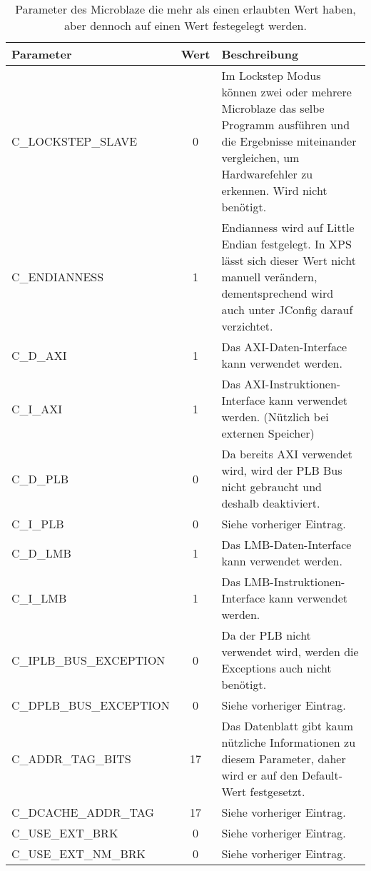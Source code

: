 \begin{table}[ht!]
\begin{tabular}{|l|c|p{10cm}|}
\hline \textbf{Parameter} & Wert & Beschreibung \\ 
\hline C\_LOCKSTEP\_SLAVE & 0 & Im Lockstep Modus können zwei oder mehrere \newline Microblaze das selbe Programm ausführen und die Ergebnisse miteinander vergleichen, um Hardwarefehler zu erkennen. Wird nicht benötigt.\\ 
\hline C\_ENDIANNESS & 1 & Endianness wird auf Little Endian festgelegt. In XPS lässt sich dieser Wert nicht manuell verändern, dementsprechend wird auch unter JConfig darauf verzichtet.\\ 
\hline C\_D\_AXI & 1 & Das AXI-Daten-Interface kann verwendet werden. \\ 
\hline C\_I\_AXI & 1 & Das AXI-Instruktionen-Interface kann verwendet werden. (Nützlich bei externen Speicher) \\ 
\hline C\_D\_PLB & 0 & Da bereits AXI verwendet wird, wird der PLB Bus nicht gebraucht und deshalb deaktiviert. \\ 
\hline C\_I\_PLB & 0 & Siehe vorheriger Eintrag. \\ 
\hline C\_D\_LMB & 1 & Das LMB-Daten-Interface kann verwendet werden. \\ 
\hline C\_I\_LMB & 1 & Das LMB-Instruktionen-Interface kann verwendet werden. \\ 
\hline C\_IPLB\_BUS\_EXCEPTION & 0 & Da der PLB nicht verwendet wird, werden die Exceptions auch nicht benötigt. \\ 
\hline C\_DPLB\_BUS\_EXCEPTION & 0 & Siehe vorheriger Eintrag. \\ 
\hline C\_ADDR\_TAG\_BITS & 17 & Das Datenblatt gibt kaum nützliche Informationen zu diesem Parameter, daher wird er auf den Default-Wert festgesetzt. \\ 
\hline C\_DCACHE\_ADDR\_TAG & 17 & Siehe vorheriger Eintrag. \\ 
\hline C\_USE\_EXT\_BRK & 0 & Siehe vorheriger Eintrag. \\ 
\hline C\_USE\_EXT\_NM\_BRK & 0 & Siehe vorheriger Eintrag. \\ 
\hline 
\end{tabular}
\caption{Parameter des Microblaze die mehr als einen erlaubten Wert haben, aber dennoch auf einen Wert festegelegt werden.}
\label{tab:MicParam}
\end{table}

 

